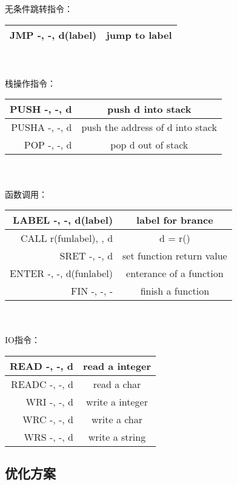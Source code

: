 无条件跳转指令：\\
\begin{tabular}{r|c}
        \hline
        JMP  -, -, d(label) & jump to label\\ \hline
\end{tabular}\\
\vbox{}\\
栈操作指令：\\
\begin{tabular}{r|c}
        \hline
        PUSH  -, -, d & push d into stack\\ \hline
        PUSHA -, -, d & push the address of d into stack \\ \hline
        POP   -, -, d & pop d out of stack\\ \hline
\end{tabular}\\
\vbox{}\\
函数调用：\\
\begin{tabular}{r|c}
        \hline
        LABEL -, -, d(label) & label for brance \\ \hline
        CALL  r(funlabel), , d & d = r()\\ \hline
        SRET  -, -, d & set function return value\\ \hline
        ENTER -, -, d(funlabel) & enterance of a function \\ \hline
        FIN   -, -, -& finish a function\\ \hline
\end{tabular}\\
\vbox{}\\
IO指令：\\
\begin{tabular}{r|c}
        \hline
        READ  -, -, d & read a integer\\ \hline
        READC -, -, d & read a char\\ \hline
        WRI   -, -, d & write a integer \\ \hline
        WRC   -, -, d & write a char \\ \hline
        WRS   -, -, d & write a string\\ \hline
\end{tabular}
\subsection{优化方案}
